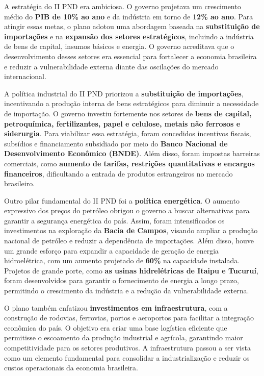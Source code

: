 \documentclass[a4paper,12pt]{article}[abntex2]
\begin{document}
A estratégia do II PND era ambiciosa. O governo projetava um crescimento médio do \textbf{PIB de 10\% ao ano} e da indústria em torno de \textbf{12\% ao ano}. Para atingir essas metas, o plano adotou uma abordagem baseada na \textbf{substituição de importações} e na \textbf{expansão dos setores estratégicos}, incluindo a indústria de bens de capital, insumos básicos e energia. O governo acreditava que o desenvolvimento desses setores era essencial para fortalecer a economia brasileira e reduzir a vulnerabilidade externa diante das oscilações do mercado internacional.

A política industrial do II PND priorizou a \textbf{substituição de importações}, incentivando a produção interna de bens estratégicos para diminuir a necessidade de importação. O governo investiu fortemente nos setores de \textbf{bens de capital, petroquímica, fertilizantes, papel e celulose, metais não ferrosos e siderurgia}. Para viabilizar essa estratégia, foram concedidos incentivos fiscais, subsídios e financiamento subsidiado por meio do \textbf{Banco Nacional de Desenvolvimento Econômico (BNDE)}. Além disso, foram impostas barreiras comerciais, como \textbf{aumento de tarifas, restrições quantitativas e encargos financeiros}, dificultando a entrada de produtos estrangeiros no mercado brasileiro.

Outro pilar fundamental do II PND foi a \textbf{política energética}. O aumento expressivo dos preços do petróleo obrigou o governo a buscar alternativas para garantir a segurança energética do país. Assim, foram intensificados os investimentos na exploração da \textbf{Bacia de Campos}, visando ampliar a produção nacional de petróleo e reduzir a dependência de importações. Além disso, houve um grande esforço para expandir a capacidade de geração de energia hidroelétrica, com um aumento projetado de \textbf{60\%} na capacidade instalada. Projetos de grande porte, como \textbf{as usinas hidrelétricas de Itaipu e Tucuruí}, foram desenvolvidos para garantir o fornecimento de energia a longo prazo, permitindo o crescimento da indústria e a redução da vulnerabilidade externa.

O plano também enfatizou \textbf{investimentos em infraestrutura}, com a construção de rodovias, ferrovias, portos e aeroportos para facilitar a integração econômica do país. O objetivo era criar uma base logística eficiente que permitisse o escoamento da produção industrial e agrícola, garantindo maior competitividade para os setores produtivos. A infraestrutura passou a ser vista como um elemento fundamental para consolidar a industrialização e reduzir os custos operacionais da economia brasileira.
\end{document}
